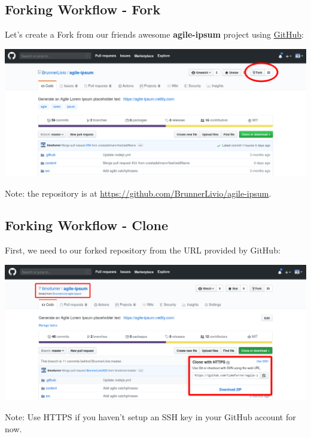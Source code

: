 \subsection{Forking Workflow - Fork}
\begin{frame}[fragile]
  \subslidetitle

  Let's create a Fork from our friends awesome \textbf{agile-ipsum} project using \href{https://github.com}{GitHub}:

    \vspace{2em}
    \centerline{\includegraphics[width=\textwidth]{../assets/images/github-forking.png}}

    \vspace{1em}
  Note: the repository is at \url{https://github.com/BrunnerLivio/agile-ipsum}.

\end{frame}

\subsection{Forking Workflow - Clone}
\begin{frame}[fragile]
  \subslidetitle

    First, we need to  our forked repository from the URL provided by GitHub:

    \vspace{1em}
    \centerline{\includegraphics[width=\textwidth]{../assets/images/github-clone.png}}

    \vspace{1em}
    Note: Use HTTPS if you haven't setup an SSH key in your GitHub account for now.
\end{frame}

